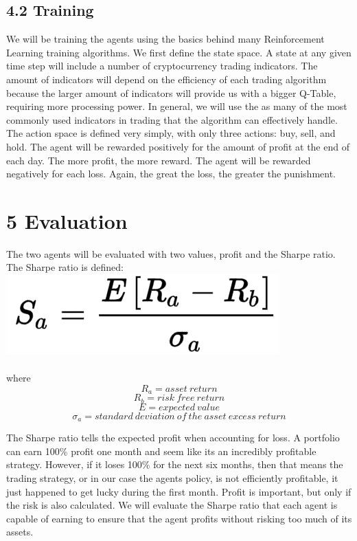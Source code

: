 \documentclass[letterpaper]{article}
\begin{document}
\subsection{4.2 Training}
We will be training the agents using the basics behind many Reinforcement Learning training algorithms. We first define the state space. A state at any given time step will include a number of cryptocurrency trading indicators. The amount of indicators will depend on the efficiency of each trading algorithm because the larger amount of indicators will provide us with a bigger Q-Table, requiring more processing power. In general, we will use the as many of the most commonly used indicators in trading that the algorithm can effectively handle. The action space is defined very simply, with only three actions: buy, sell, and hold. The agent will be rewarded positively for the amount of profit at the end of each day. The more profit, the more reward. The agent will be rewarded negatively for each loss. Again, the great the loss, the greater the punishment.

\section{5 Evaluation}
The two agents will be evaluated with two values, profit and the Sharpe ratio. The Sharpe ratio is defined:
\includegraphics{Sharpe} 
\\
\\
where
\[ R_a = asset\ return \] 
\[ R_b = risk\ free\ return \] 
\[ E = expected\  value \] 
\[ \sigma_a = standard\ deviation\ of\ the\ asset\ excess\ return \] 

The Sharpe ratio tells the expected profit when accounting for loss. A portfolio can earn 100\% profit one month and seem like its an incredibly profitable strategy. However, if it loses 100\% for the next six months, then that means the trading strategy, or in our case the agents policy, is not efficiently profitable, it just happened to get lucky during the first month. Profit is important, but only if the risk is also calculated. We will evaluate the Sharpe ratio that each agent is capable of earning to ensure that the agent profits without risking too much of its assets.
	
\end{document}
